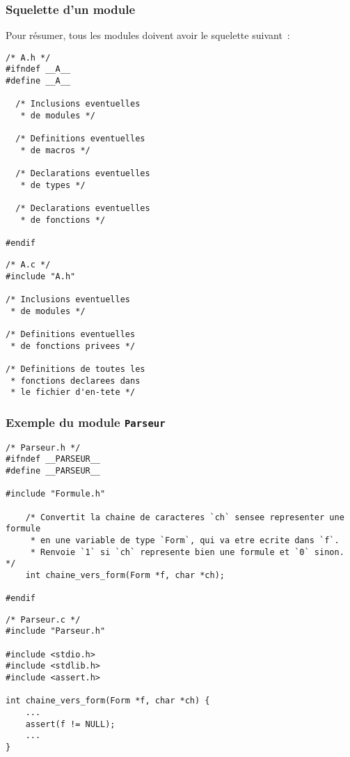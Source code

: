 \begin{frame}[fragile]
\frametitle{Squelette d'un module}
Pour résumer, tous les modules doivent avoir le squelette suivant~:
\begin{minipage}[c]{.42\textwidth}
\begin{lstlisting}[frame=single,numbers=none]
/* A.h */
#ifndef __A__
#define __A__

  /* Inclusions eventuelles
   * de modules */

  /* Definitions eventuelles
   * de macros */

  /* Declarations eventuelles
   * de types */

  /* Declarations eventuelles
   * de fonctions */

#endif
\end{lstlisting}
\end{minipage}
\qquad
\begin{minipage}[c]{.45\textwidth}
\begin{lstlisting}[frame=single,numbers=none]
/* A.c */
#include "A.h"

/* Inclusions eventuelles
 * de modules */

/* Definitions eventuelles
 * de fonctions privees */

/* Definitions de toutes les
 * fonctions declarees dans
 * le fichier d'en-tete */
\end{lstlisting}
\end{minipage}
\end{frame}

\begin{frame}[fragile]
\frametitle{Exemple du module {\tt Parseur}}
\begin{minipage}[c]{.9\textwidth}
\begin{lstlisting}[frame=single,numbers=none,basicstyle=\ttfamily\scriptsize]
/* Parseur.h */
#ifndef __PARSEUR__
#define __PARSEUR__

#include "Formule.h"

    /* Convertit la chaine de caracteres `ch` sensee representer une formule
     * en une variable de type `Form`, qui va etre ecrite dans `f`.
     * Renvoie `1` si `ch` represente bien une formule et `0` sinon. */
    int chaine_vers_form(Form *f, char *ch);

#endif
\end{lstlisting}
\end{minipage}

\begin{minipage}[c]{.5\textwidth}
\begin{lstlisting}[frame=single,numbers=none,basicstyle=\ttfamily\scriptsize]
/* Parseur.c */
#include "Parseur.h"

#include <stdio.h>
#include <stdlib.h>
#include <assert.h>

int chaine_vers_form(Form *f, char *ch) {
    ...
    assert(f != NULL);
    ...
}
\end{lstlisting}
\end{minipage}
\end{frame}

